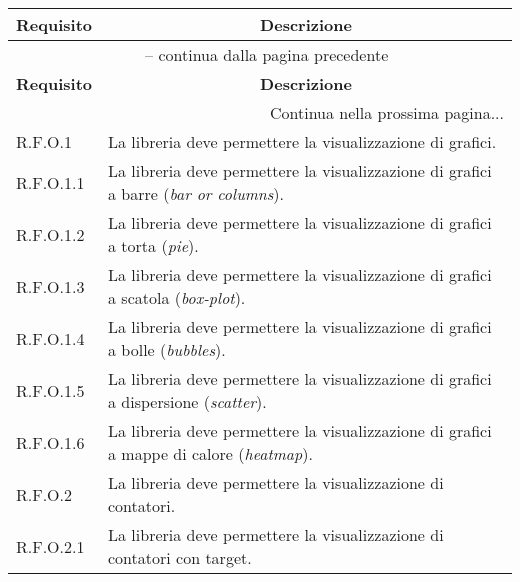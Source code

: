 \begin{center}
    \begin{longtable}{|p{2.5cm}|p{10cm}|}
        \hline
        \rowcolor{gray!30}
        \textbf{Requisito} & \multicolumn{1}{c|}{\textbf{Descrizione}}                                                          \\
        \hline
        \endfirsthead
        \multicolumn{2}{c}{{\tablename\ \thetable{} -- continua dalla pagina precedente}}                                       \\
        \hline
        \rowcolor{gray!30}
        \textbf{Requisito} & \multicolumn{1}{c|}{\textbf{Descrizione}}                                                          \\
        \endhead
        \hline
        \multicolumn{2}{|r|}{{Continua nella prossima pagina...}}                                                               \\
        \hline
        \endfoot
        \hline
        \endlastfoot
        R.F.O.1            & La libreria deve permettere la visualizzazione di grafici.                                         \\
        \hline
        R.F.O.1.1          & La libreria deve permettere la visualizzazione di grafici a barre (\textit{bar or columns}).       \\
        \hline
        R.F.O.1.2          & La libreria deve permettere la visualizzazione di grafici a torta (\textit{pie}).                  \\
        \hline
        R.F.O.1.3          & La libreria deve permettere la visualizzazione di grafici a scatola (\textit{box-plot}).           \\
        \hline
        R.F.O.1.4          & La libreria deve permettere la visualizzazione di grafici a bolle (\textit{bubbles}).              \\
        \hline
        R.F.O.1.5          & La libreria deve permettere la visualizzazione di grafici a dispersione (\textit{scatter}).        \\
        \hline
        R.F.O.1.6          & La libreria deve permettere la visualizzazione di grafici a mappe di calore (\textit{heatmap}).    \\
        \hline
        R.F.O.2            & La libreria deve permettere la visualizzazione di contatori.                                       \\
        \hline
        R.F.O.2.1          & La libreria deve permettere la visualizzazione di contatori con target.                            \\

\end{longtable}
\end{center}
